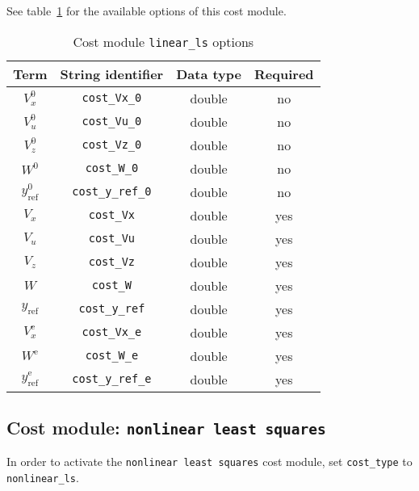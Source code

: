 \documentclass[english]{article}
\newcommand{\code}[1]{\texttt{#1}}
\newcommand{\ind}[1]{_{\textrm{#1}}}
\newcommand{\terminal}{^{\textrm{e}}}
\newcommand{\initial}{^{\textrm{0}}}
\newcommand{\mandatory}{yes}
\newcommand{\optional}{no}
\begin{document}
See table~\ref{tab:cost:linear_ls} for the available options of this cost module.
%
\begin{table}[ht!]
    \centering
    \caption{Cost module \code{linear\_ls} options} \label{tab:cost:linear_ls}
    \begin{tabular}{cccc}
        \toprule
        Term & String identifier & Data type & Required \\ \midrule
        $ V_x\initial $ & \code{cost\_Vx\_0}    & double & \optional   \\
        $ V_u\initial $ & \code{cost\_Vu\_0}    & double & \optional   \\
        $ V_z\initial $ & \code{cost\_Vz\_0}    & double & \optional  \\
        $ W\initial $ & \code{cost\_W\_0}    & double & \optional  \\
        $ y\ind{ref}\initial $ & \code{cost\_y\_ref\_0}    & double & \optional   \\ [1em]
        $ V_x $ & \code{cost\_Vx}    & double & \mandatory   \\
        $ V_u $ & \code{cost\_Vu}    & double & \mandatory   \\
        $ V_z $ & \code{cost\_Vz}    & double & \mandatory  \\
        $ W $ & \code{cost\_W}    & double & \mandatory  \\
        $ y\ind{ref} $ & \code{cost\_y\_ref}    & double & \mandatory   \\ [1em]
        $ V_x\terminal $ & \code{cost\_Vx\_e}    & double  & \mandatory  \\
        $ W\terminal $ & \code{cost\_W\_e}    & double & \mandatory   \\
        $ y\ind{ref}\terminal $ & \code{cost\_y\_ref\_e}   & double & \mandatory   \\
        \bottomrule
    \end{tabular}
\end{table}
%
\subsection{Cost module: \code{nonlinear least squares}}\label{sec:cost:nonlinear_ls}
%
In order to activate the \code{nonlinear least squares} cost module, set \code{cost\_type} to \code{nonlinear\_ls}.
\end{document}
